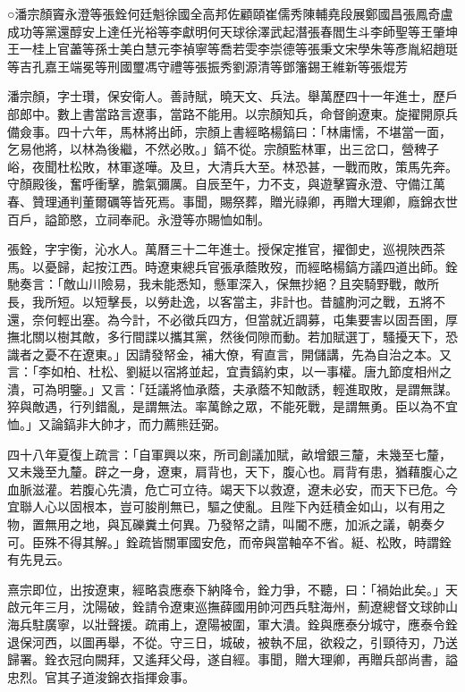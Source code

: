 
\begin{pinyinscope}
○潘宗顏竇永澄等張銓何廷魁徐國全高邦佐顧頤崔儒秀陳輔堯段展鄭國昌張鳳奇盧成功等黨還醇安上達任光裕等李獻明何天球徐澤武起潛張春閻生斗李師聖等王肇坤王一桂上官藎等孫士美白慧元李禎寧等喬若雯李崇德等張秉文宋學朱等彥胤紹趙珽等吉孔嘉王端冕等刑國璽馮守禮等張振秀劉源清等鄧籓錫王維新等張焜芳

潘宗顏，字士瓚，保安衛人。善詩賦，曉天文、兵法。舉萬歷四十一年進士，歷戶部郎中。數上書當路言遼事，當路不能用。以宗顏知兵，命督餉遼東。旋擢開原兵備僉事。四十六年，馬林將出師，宗顏上書經略楊鎬曰：「林庸懦，不堪當一面，乞易他將，以林為後繼，不然必敗。」鎬不從。宗顏監林軍，出三岔口，營稗子峪，夜聞杜松敗，林軍遂嘩。及旦，大清兵大至。林恐甚，一戰而敗，策馬先奔。守顏殿後，奮呼衝擊，膽氣彌厲。自辰至午，力不支，與遊擊竇永澄、守備江萬春、贊理通判董爾礪等皆死焉。事聞，賜祭葬，贈光祿卿，再贈大理卿，廕錦衣世百戶，謚節愍，立祠奉祀。永澄等亦賜恤如制。

張銓，字宇衡，沁水人。萬曆三十二年進士。授保定推官，擢御史，巡視陜西茶馬。以憂歸，起按江西。時遼東總兵官張承蔭敗歿，而經略楊鎬方議四道出師。銓馳奏言：「敵山川險易，我未能悉知，懸軍深入，保無抄絕？且突騎野戰，敵所長，我所短。以短擊長，以勞赴逸，以客當主，非計也。昔臚朐河之戰，五將不還，奈何輕出塞。為今計，不必徵兵四方，但當就近調募，屯集要害以固吾圉，厚撫北關以樹其敵，多行間諜以攜其黨，然後伺隙而動。若加賦選丁，騷擾天下，恐識者之憂不在遼東。」因請發帑金，補大僚，宥直言，開儲講，先為自治之本。又言：「李如柏、杜松、劉綎以宿將並起，宜責鎬約束，以一事權。唐九節度相州之潰，可為明鑒。」又言：「廷議將恤承蔭，夫承蔭不知敵誘，輕進取敗，是謂無謀。猝與敵遇，行列錯亂，是謂無法。率萬餘之眾，不能死戰，是謂無勇。臣以為不宜恤。」又論鎬非大帥才，而力薦熊廷弼。

四十八年夏復上疏言：「自軍興以來，所司創議加賦，畝增銀三釐，未幾至七釐，又未幾至九釐。辟之一身，遼東，肩背也，天下，腹心也。肩背有患，猶藉腹心之血脈滋灌。若腹心先潰，危亡可立待。竭天下以救遼，遼未必安，而天下已危。今宜聯人心以固根本，豈可朘削無已，驅之使亂。且陛下內廷積金如山，以有用之物，置無用之地，與瓦礫糞土何異。乃發帑之請，叫閽不應，加派之議，朝奏夕可。臣殊不得其解。」銓疏皆關軍國安危，而帝與當軸卒不省。綎、松敗，時謂銓有先見云。

熹宗即位，出按遼東，經略袁應泰下納降令，銓力爭，不聽，曰：「禍始此矣。」天啟元年三月，沈陽破，銓請令遼東巡撫薛國用帥河西兵駐海州，薊遼總督文球帥山海兵駐廣寧，以壯聲援。疏甫上，遼陽被圍，軍大潰。銓與應泰分城守，應泰令銓退保河西，以圖再舉，不從。守三日，城破，被執不屈，欲殺之，引頸待刃，乃送歸署。銓衣冠向闕拜，又遙拜父母，遂自經。事聞，贈大理卿，再贈兵部尚書，謚忠烈。官其子道浚錦衣指揮僉事。


\end{pinyinscope}
